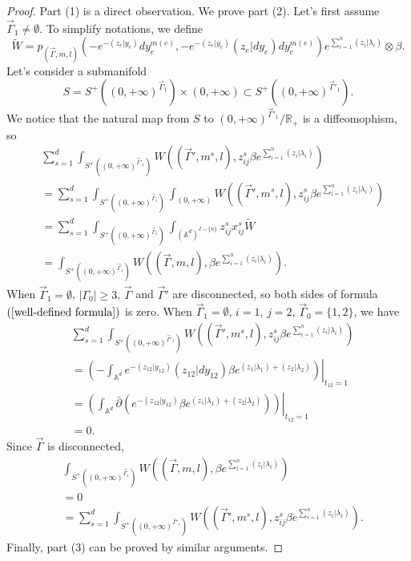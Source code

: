 \documentclass[11pt]{amsart}
\theoremstyle{definition}
\theoremstyle{remark}
\numberwithin{equation}{section}
\begin{document}
\begin{proof}
    Part (1) is a direct observation.
    We prove part (2). Let's first assume $\vec{\Gamma}_{1}\neq\emptyset$. To simplify notations, we define
    $$
    \tilde{W}=p_{(\vec{\Gamma},m,l)}(-e^{-(z_{e}|y_{e})}dy_{e}^{m(e)},-e^{-(z_{e}| y_{e})}(z_{e}|dy_{e})dy_{e}^{m(e)})e^{\sum\limits_{i=1}^{n}(z_{i}|\lambda_{i})}\otimes \beta.
    $$
    Let's consider a submanifold
    $$
    S=S^{+}((0,+\infty)^{\vec{\Gamma}_{1}})\times(0,+\infty)\subset S^{+}((0,+\infty)^{\vec{\Gamma}'_{1}}).
    $$
    We notice that the natural map from $S$ to $(0,+\infty)^{\vec{\Gamma}'_{1}}/\mathbb{R}_+$ is a diffeomophism, so
    \begin{align*}
        &\sum_{s=1}^{d}\int_{S^{+}((0,+\infty)^{\vec{\Gamma}'_{1}})}W((\vec{\Gamma}',m^{s},l),z_{ij}^{s}\beta e^{\sum\limits_{i=1}^{n}(z_{i}|\lambda_{i})})\\
        &=
        \sum_{s=1}^{d}\int_{S^{+}((0,+\infty)^{\vec{\Gamma}_{1}})}\int_{(0,+\infty)}W((\vec{\Gamma}',m^{s},l),z_{ij}^{s}\beta e^{\sum\limits_{i=1}^{n}(z_{i}|\lambda_{i})})\\
        &=\sum_{s=1}^{d}\int_{S^{+}((0,+\infty)^{\vec{\Gamma}_{1}})}\int_{(\mathbb{A}^{d})^{ I-\{n\}}}z_{ij}^{s}x_{ij}^{s}\tilde{W}\\
        &=
        \int_{S^{+}((0,+\infty)^{\vec{\Gamma}_{1}})}W((\vec{\Gamma},m,l),\beta e^{\sum\limits_{i=1}^{n}(z_{i}|\lambda_{i})}).
    \end{align*}
    When $\vec{\Gamma}_{1}=\emptyset$, $|\Gamma_{0}|\geq3$, $\vec{\Gamma}$ and $\vec{\Gamma}'$ are disconnected, so both sides of formula $(\ref{well-defined formula})$ is zero. When $\vec{\Gamma}_{1}=\emptyset$, $i=1$, $j=2$, $\vec{\Gamma}_{0}=\{1,2\}$, we have
    \begin{align*}
        &\sum_{s=1}^{d}\int_{S^{+}((0,+\infty)^{\vec{\Gamma}'_{1}})}W((\vec{\Gamma}',m^{s},l),z_{ij}^{s}\beta e^{\sum\limits_{i=1}^{n}(z_{i}|\lambda_{i})})\\
        &=
        \left.\left(
        -\int_{\mathbb{A}^{d}}e^{-(z_{12}| y_{12})}(z_{12}| dy_{12})\beta e^{(z_{1}| \lambda_{1})+(z_{2}|\lambda_{2})}
        \right)\right|_{t_{12}=1}\\
        &=
        \left.\left(
        \int_{\mathbb{A}^{d}}\bar{\partial}\left(e^{-(z_{12}| y_{12})}\beta e^{(z_{1}| \lambda_{1})+(z_{2}|\lambda_{2})}
        \right)\right)\right|_{t_{12}=1}\\
        &=0.
    \end{align*}
    Since $\vec{\Gamma}$ is disconnected,
    \begin{align*}
        &\int_{S^{+}((0,+\infty)^{\vec{\Gamma}_{1}})}W((\vec{\Gamma},m,l),\beta e^{\sum\limits_{i=1}^{n}(z_{i}|\lambda_{i})})\\
        &=0\\
        &=
        \sum_{s=1}^{d}\int_{S^{+}((0,+\infty)^{\vec{\Gamma}'_{1}})}W((\vec{\Gamma}',m^{s},l),z_{ij}^{s}\beta e^{\sum\limits_{i=1}^{n}(z_{i}|\lambda_{i})}).
    \end{align*}
    Finally, part (3) can be proved by similar arguments.
\end{proof}
\end{document}
